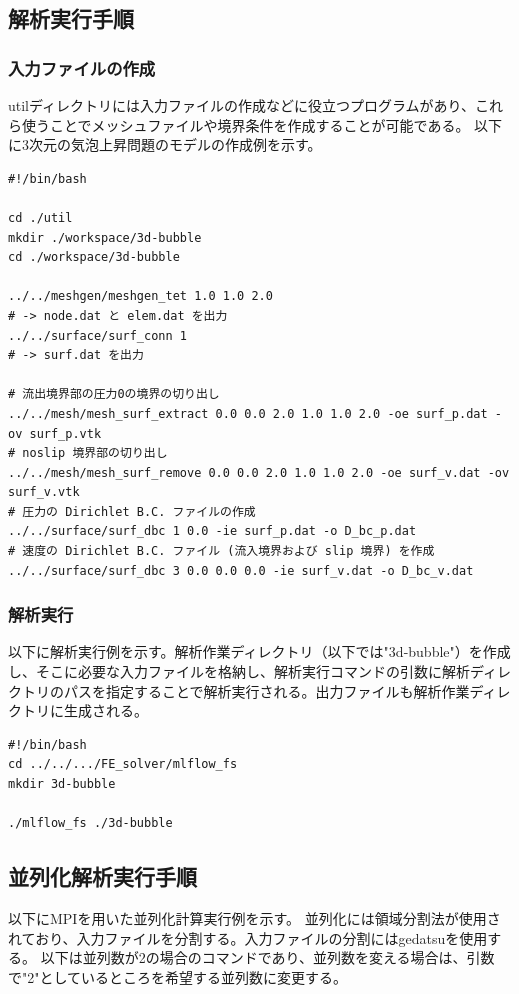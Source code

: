 \documentclass[8pt,a4paper]{article}
\begin{document}
\subsection{解析実行手順}
\subsubsection{入力ファイルの作成}

utilディレクトリには入力ファイルの作成などに役立つプログラムがあり、これら使うことでメッシュファイルや境界条件を作成することが可能である。
以下に3次元の気泡上昇問題のモデルの作成例を示す。
\begin{lstlisting}[]
#!/bin/bash

cd ./util
mkdir ./workspace/3d-bubble
cd ./workspace/3d-bubble

../../meshgen/meshgen_tet 1.0 1.0 2.0
# -> node.dat と elem.dat を出力
../../surface/surf_conn 1
# -> surf.dat を出力

# 流出境界部の圧力0の境界の切り出し
../../mesh/mesh_surf_extract 0.0 0.0 2.0 1.0 1.0 2.0 -oe surf_p.dat -ov surf_p.vtk
# noslip 境界部の切り出し
../../mesh/mesh_surf_remove 0.0 0.0 2.0 1.0 1.0 2.0 -oe surf_v.dat -ov surf_v.vtk
# 圧力の Dirichlet B.C. ファイルの作成
../../surface/surf_dbc 1 0.0 -ie surf_p.dat -o D_bc_p.dat
# 速度の Dirichlet B.C. ファイル (流入境界および slip 境界) を作成
../../surface/surf_dbc 3 0.0 0.0 0.0 -ie surf_v.dat -o D_bc_v.dat
\end{lstlisting}

\subsubsection{解析実行}

以下に解析実行例を示す。解析作業ディレクトリ（以下では"3d-bubble"）を作成し、そこに必要な入力ファイルを格納し、解析実行コマンドの引数に解析ディレクトリのパスを指定することで解析実行される。出力ファイルも解析作業ディレクトリに生成される。
\begin{lstlisting}[]
#!/bin/bash
cd ../../.../FE_solver/mlflow_fs
mkdir 3d-bubble

./mlflow_fs ./3d-bubble
\end{lstlisting}

\subsection{並列化解析実行手順}

以下にMPIを用いた並列化計算実行例を示す。
並列化には領域分割法が使用されており、入力ファイルを分割する。入力ファイルの分割にはgedatsuを使用する。
以下は並列数が2の場合のコマンドであり、並列数を変える場合は、引数で"2"としているところを希望する並列数に変更する。
\end{document}
